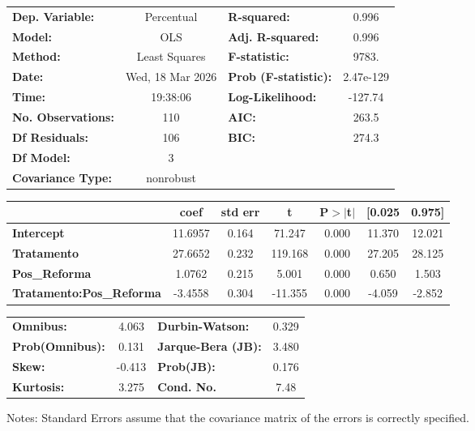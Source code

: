 \begin{center}
\begin{tabular}{lclc}
\toprule
\textbf{Dep. Variable:}          &    Percentual    & \textbf{  R-squared:         } &     0.996   \\
\textbf{Model:}                  &       OLS        & \textbf{  Adj. R-squared:    } &     0.996   \\
\textbf{Method:}                 &  Least Squares   & \textbf{  F-statistic:       } &     9783.   \\
\textbf{Date:}                   & Wed, 18 Mar 2026 & \textbf{  Prob (F-statistic):} & 2.47e-129   \\
\textbf{Time:}                   &     19:38:06     & \textbf{  Log-Likelihood:    } &   -127.74   \\
\textbf{No. Observations:}       &         110      & \textbf{  AIC:               } &     263.5   \\
\textbf{Df Residuals:}           &         106      & \textbf{  BIC:               } &     274.3   \\
\textbf{Df Model:}               &           3      & \textbf{                     } &             \\
\textbf{Covariance Type:}        &    nonrobust     & \textbf{                     } &             \\
\bottomrule
\end{tabular}
\begin{tabular}{lcccccc}
                                 & \textbf{coef} & \textbf{std err} & \textbf{t} & \textbf{P$> |$t$|$} & \textbf{[0.025} & \textbf{0.975]}  \\
\midrule
\textbf{Intercept}               &      11.6957  &        0.164     &    71.247  &         0.000        &       11.370    &       12.021     \\
\textbf{Tratamento}              &      27.6652  &        0.232     &   119.168  &         0.000        &       27.205    &       28.125     \\
\textbf{Pos\_Reforma}            &       1.0762  &        0.215     &     5.001  &         0.000        &        0.650    &        1.503     \\
\textbf{Tratamento:Pos\_Reforma} &      -3.4558  &        0.304     &   -11.355  &         0.000        &       -4.059    &       -2.852     \\
\bottomrule
\end{tabular}
\begin{tabular}{lclc}
\textbf{Omnibus:}       &  4.063 & \textbf{  Durbin-Watson:     } &    0.329  \\
\textbf{Prob(Omnibus):} &  0.131 & \textbf{  Jarque-Bera (JB):  } &    3.480  \\
\textbf{Skew:}          & -0.413 & \textbf{  Prob(JB):          } &    0.176  \\
\textbf{Kurtosis:}      &  3.275 & \textbf{  Cond. No.          } &     7.48  \\
\bottomrule
\end{tabular}
\end{center}

Notes: \newline
 [1] Standard Errors assume that the covariance matrix of the errors is correctly specified.
